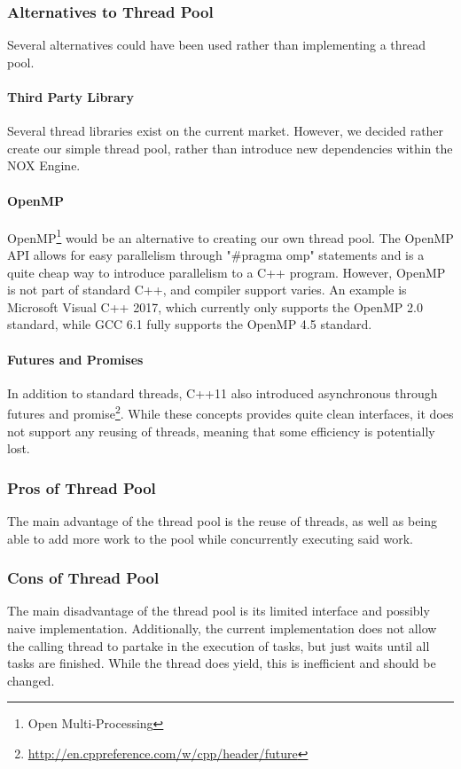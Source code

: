 \subsubsection{Alternatives to Thread Pool}
Several alternatives could have been used rather than implementing a thread pool.

\paragraph{Third Party Library}
Several thread libraries exist on the current market.
However, we decided rather create our simple thread pool, rather than introduce new dependencies within the NOX Engine.

\paragraph{OpenMP}
OpenMP\footnote{Open Multi-Processing} would be an alternative to creating our own thread pool.
The OpenMP API allows for easy parallelism through "\#pragma omp" statements and is a quite cheap way to introduce
parallelism to a C++ program. However, OpenMP is not part of standard C++, and compiler support varies.
An example is Microsoft Visual C++ 2017, which currently only supports the OpenMP 2.0 standard\cite{microsoft_openmp_support},
while GCC 6.1 fully supports the OpenMP 4.5 standard\cite{gcc_openmp_support}.

\paragraph{Futures and Promises}
In addition to standard threads, C++11 also introduced asynchronous through futures and promise\footnote{\url{http://en.cppreference.com/w/cpp/header/future}}.
While these concepts provides quite clean interfaces, it does not support any reusing of threads, meaning that some efficiency is potentially lost.

\subsubsection{Pros of Thread Pool}
The main advantage of the thread pool is the reuse of threads, as well as being able to add more work to the pool while concurrently executing said work.

\subsubsection{Cons of Thread Pool}
The main disadvantage of the thread pool is its limited interface and possibly naive implementation.
Additionally, the current implementation does not allow the calling thread to partake in the execution of tasks,
but just waits until all tasks are finished.
While the thread does yield, this is inefficient and should be changed.
